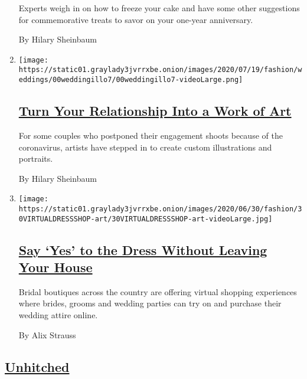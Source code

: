 \begin{enumerate}
  Experts weigh in on how to freeze your cake and have some other
  suggestions for commemorative treats to savor on your one-year
  anniversary.

  By Hilary Sheinbaum
\item
  \texttt{[image: https://static01.graylady3jvrrxbe.onion/images/2020/07/19/fashion/weddings/00weddingillo7/00weddingillo7-videoLarge.png]}

  \hypertarget{turn-your-relationship-into-a-work-of-art}{%
  \subsection{\texorpdfstring{\href{/2020/07/15/fashion/weddings/turn-your-relationship-into-a-work-of-art.html}{Turn
  Your Relationship Into a Work of
  Art}}{Turn Your Relationship Into a Work of Art}}\label{turn-your-relationship-into-a-work-of-art}}

  For some couples who postponed their engagement shoots because of the
  coronavirus, artists have stepped in to create custom illustrations
  and portraits.

  By Hilary Sheinbaum
\item
  \texttt{[image: https://static01.graylady3jvrrxbe.onion/images/2020/06/30/fashion/30VIRTUALDRESSSHOP-art/30VIRTUALDRESSSHOP-art-videoLarge.jpg]}

  \hypertarget{say-yes-to-the-dress-without-leaving-your-house}{%
  \subsection{\texorpdfstring{\href{/2020/06/30/fashion/weddings/say-yes-to-the-dress-without-leaving-your-house.html}{Say
  `Yes' to the Dress Without Leaving Your
  House}}{Say `Yes' to the Dress Without Leaving Your House}}\label{say-yes-to-the-dress-without-leaving-your-house}}

  Bridal boutiques across the country are offering virtual shopping
  experiences where brides, grooms and wedding parties can try on and
  purchase their wedding attire online.

  By Alix Strauss
\end{enumerate}

\hypertarget{unhitched}{%
\subsection{\texorpdfstring{\href{/column/unhitched}{Unhitched}}{Unhitched}}\label{unhitched}}

